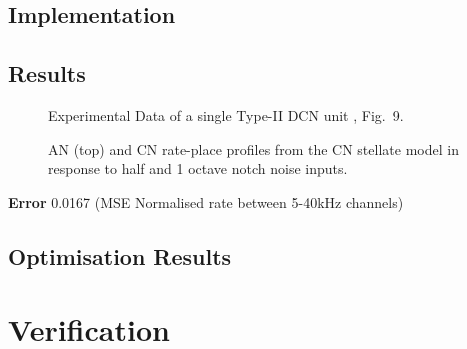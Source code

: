 \subsection{Implementation}



\clearpage
\subsection{Results} 

\begin{figure}[htb]
  \centering
\caption{Experimental Data of a single Type-II DCN unit \citep{ReissYoung:2005}, Fig.~9.}
  \label{fig:TVReissFig9}
\end{figure}


\begin{figure}[tbh]
  \centering
\caption{AN (top) and CN rate-place profiles from the CN stellate
  model in response to half and 1 octave notch noise inputs. }
\label{fig:TVResults}
\end{figure}


\textbf{Error} 0.0167  (MSE Normalised rate between 5-40kHz channels)



\subsection{Optimisation Results}


\section{Verification}



